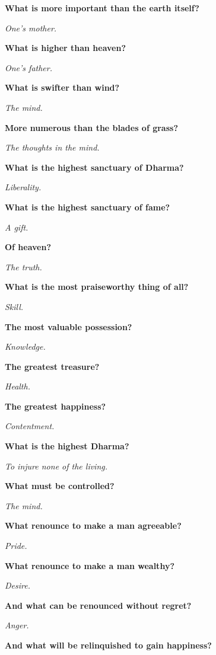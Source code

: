 \vspace*{1.2cm}
\textbf{What is more important than the earth itself?}

\textit{One's mother.}\medskip

\textbf{What is higher than heaven?}

\textit{One's father.}\medskip

\textbf{What is swifter than wind?}

\textit{The mind.}\medskip

\textbf{More numerous than the blades of grass?}

\textit{The thoughts in the mind.}\medskip

\textbf{What is the highest sanctuary of Dharma?}

\textit{Liberality.}\medskip

\textbf{What is the highest sanctuary of fame?}

\textit{A gift.}\medskip

\textbf{Of heaven?}

\textit{The truth.}\medskip

\textbf{What is the most praiseworthy thing of all?}

\textit{Skill.}\medskip

\textbf{The most valuable possession?}

\textit{Knowledge.}\medskip

\textbf{The greatest treasure?}

\textit{Health.}\medskip

\textbf{The greatest happiness?}

\textit{Contentment.}\medskip

\textbf{What is the highest Dharma?}

\textit{To injure none of the living.}\medskip

\textbf{What must be controlled?}

\textit{The mind.}\medskip

\textbf{What renounce to make a man agreeable?}

\textit{Pride.}\medskip\vfill\pagebreak\vspace*{1.2cm}

\textbf{What renounce to make a man wealthy?}

\textit{Desire.}\medskip

\textbf{And what can be renounced without regret?}

\textit{Anger.}\medskip

\textbf{And what will be relinquished to gain happiness?}


